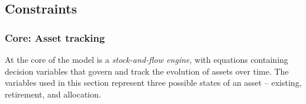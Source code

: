 \documentclass{amsart}
\begin{document}
\subsection{Constraints}
\subsubsection{Core: Asset tracking}
%
\noindent 
%
At the core of the model is a \emph{stock-and-flow engine}, with equations 
containing decision variables that govern and track the evolution of assets 
over time. The variables used in this section represent three possible states 
of an asset – existing, retirement, and allocation. 



\end{document}
